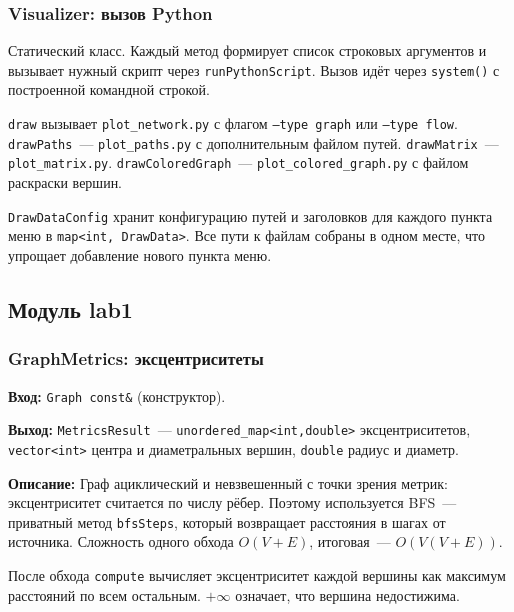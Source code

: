 \subsubsection{Visualizer: вызов Python}

Статический класс. Каждый метод формирует список строковых аргументов
и вызывает нужный скрипт через \texttt{runPythonScript}. Вызов идёт через \texttt{system()} с построенной
командной строкой.

\texttt{draw} вызывает \texttt{plot\_network.py} с флагом \texttt{--type graph}
или \texttt{--type flow}. \texttt{drawPaths}~--- \texttt{plot\_paths.py}
с дополнительным файлом путей. \texttt{drawMatrix}~--- \texttt{plot\_matrix.py}.
\texttt{drawColoredGraph}~--- \texttt{plot\_colored\_graph.py} с файлом
раскраски вершин.

\texttt{DrawDataConfig} хранит конфигурацию путей и заголовков для каждого
пункта меню в \texttt{map<int, DrawData>}. Все пути к файлам
собраны в одном месте, что упрощает добавление нового пункта меню.

\subsection{Модуль lab1}

\subsubsection{GraphMetrics: эксцентриситеты}

\textbf{Вход:} \texttt{Graph const\&} (конструктор).

\textbf{Выход:} \texttt{MetricsResult}~--- \texttt{unordered\_map<int,double>}
эксцентриситетов, \texttt{vector<int>} центра и диаметральных вершин,
\texttt{double} радиус и диаметр.

\textbf{Описание:} Граф ациклический и невзвешенный с точки зрения метрик:
эксцентриситет считается по числу рёбер. Поэтому  используется BFS~--- приватный метод \texttt{bfsSteps},
который возвращает расстояния в шагах от источника. Сложность одного
обхода $O(V + E)$, итоговая~--- $O(V(V+E))$.

После обхода \texttt{compute} вычисляет эксцентриситет каждой вершины
как максимум расстояний по всем остальным. $+\infty$ означает, что
вершина недостижима.

